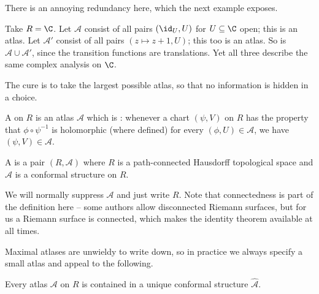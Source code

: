 There is an annoying redundancy here, which the next example exposes.

\begin{example}\label{ex:atlasesonC}
	Take $R = \C$. Let $\mathcal{A}$ consist of all pairs $(\id_U, U)$ for $U \subseteq \C$
	open; this is an atlas. Let $\mathcal{A}'$ consist of all pairs $(z \mapsto z + 1, U)$;
	this too is an atlas. So is $\mathcal{A} \cup \mathcal{A}'$, since the transition
	functions are translations. Yet all three describe the same complex analysis on $\C$.
\end{example}

The cure is to take the largest possible atlas, so that no information is hidden in a
choice.

\begin{definition}
	A  on $R$ is an atlas $\mathcal{A}$ which is :
	whenever a chart $(\psi, V)$ on $R$ has the property that $\phi \circ \psi^{-1}$ is
	holomorphic (where defined) for every $(\phi, U) \in \mathcal{A}$, we have
	$(\psi, V) \in \mathcal{A}$.
\end{definition}

\begin{definition}
	A  is a pair $(R, \mathcal{A})$ where $R$ is a path-connected
	Hausdorff topological space and $\mathcal{A}$ is a conformal structure on $R$.
\end{definition}

We will normally suppress $\mathcal{A}$ and just write $R$. Note that connectedness is
part of the definition here -- some authors allow disconnected Riemann surfaces, but for
us a Riemann surface is connected, which makes the identity theorem available at all
times.

Maximal atlases are unwieldy to write down, so in practice we always specify a small
atlas and appeal to the following.

\begin{lemma}\label{lem:atlasextends}
	Every atlas $\mathcal{A}$ on $R$ is contained in a unique conformal structure
	$\hat{\mathcal{A}}$.
\end{lemma}

